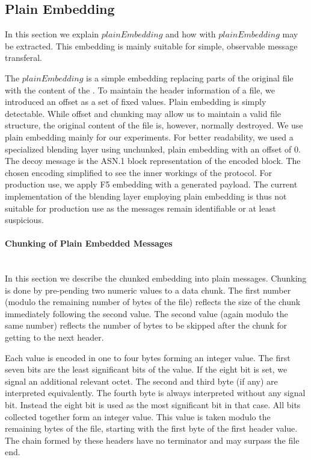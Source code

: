\subsection{Plain Embedding}
In this section we explain $plainEmbedding$ and how \VortexMessages{} with $plainEmbedding$ may be extracted. This embedding is mainly suitable for simple, observable message transferal.

The $plainEmbedding$ is a simple embedding replacing parts of the original file with the content of the \VortexMessage. To maintain the header information of a file, we introduced an offset as a set of fixed values. Plain embedding is simply detectable. While offset and chunking may allow us to maintain a valid file structure, the original content of the file is, however, normally destroyed. We use plain embedding mainly for our experiments. For better readability, we used a specialized blending layer using unchunked, plain embedding with an offset of $0$. The decoy message is the ASN.1 block representation of the encoded block. The chosen encoding simplified to see the inner workings of the protocol. For production use, we apply F5 embedding with a generated payload. The current implementation of the blending layer employing plain embedding is thus not suitable for production use as the messages remain identifiable or at least suspicious.

\paragraph{Chunking of Plain Embedded Messages}\label{sec:chunkingPlain}~\\
In this section we describe the chunked embedding into plain messages. Chunking is done by pre-pending two numeric values to a data chunk. The first number (modulo the remaining number of bytes of the file) reflects the size of the chunk immediately following the second value. The second value (again modulo the same number)  reflects the number of bytes to be skipped after the chunk for getting to the next header.

Each value is encoded in one to four bytes forming an integer value. The first seven bits are the least significant bits of the value. If the eight bit is set, we signal an additional relevant octet. The second and third byte (if any) are interpreted equivalently. The fourth byte is always interpreted without any signal bit. Instead the eight bit is used as the most significant bit in that case. All bits collected together form an integer value. This value is taken modulo the remaining bytes of the file, starting with the first byte of the first header value. The chain formed by these headers have no terminator and may surpass the file end.

